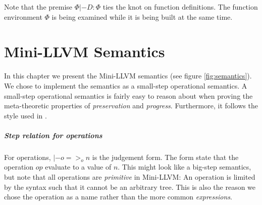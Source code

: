 \documentclass[a4paper, oneside, 10pt, draft]{memoir}
\begin{document}
Note that the premise $\Phi |- D : \Phi$ ties the knot on function
definitions. The function environment $\Phi$ is being examined while it
is being built at the same time.



\chapter{Mini-LLVM Semantics}

In this chapter we present the Mini-LLVM semantics (see figure
\ref{fig:semantics}). We chose to implement the semantics as a
small-step operational semantics. A small-step operational semantics
is fairly easy to reason about when proving the meta-theoretic
properties of \emph{preservation} and \emph{progress}. Furthermore, it
follows the style used in \cite{pierce:2002:types}.

\paragraph{Step relation for operations}

\newcommand{\eop}{=>_{o}} For operations, $\boxed{|- o \eop n}$ is the
judgement form. The form state that the operation $op$ evaluate to a
value of $n$. This might look like a big-step semantics, but note that
all operations are \emph{primitive} in Mini-LLVM: An operation is
limited by the syntax such that it cannot be an arbitrary tree. This
is also the reason we chose the operation as a name rather than the
more common \emph{expressions}.
\end{document}
